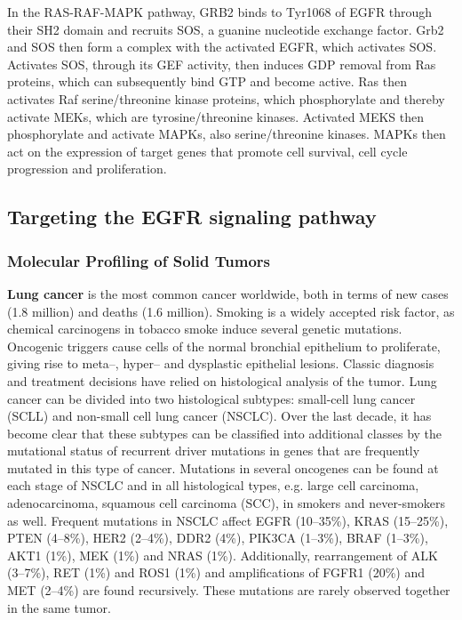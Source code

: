       In the RAS-RAF-MAPK pathway, GRB2 binds to Tyr1068 of EGFR through their
      SH2 domain and recruits SOS, a guanine nucleotide exchange factor. Grb2
      and SOS then form a complex with the activated EGFR, which activates SOS.
      Activates SOS, through its GEF activity, then induces GDP removal from Ras
      proteins, which can subsequently bind GTP and become active. Ras then
      activates Raf serine/threonine kinase proteins, which phosphorylate and
      thereby activate MEKs, which are tyrosine/threonine kinases. Activated
      MEKS then phosphorylate and activate MAPKs, also serine/threonine kinases.
      MAPKs then act on the expression of target genes that promote cell survival,
      cell cycle progression and proliferation.

  \subsection{Targeting the EGFR signaling pathway}

    \subsubsection{Molecular Profiling of Solid Tumors}

      \textbf{Lung cancer} is the most common cancer worldwide, both in terms of
      new cases (1.8 million) and deaths (1.6 million). Smoking is a widely
      accepted risk factor, as chemical carcinogens in tobacco smoke induce
      several genetic mutations. Oncogenic triggers cause cells of the normal
      bronchial epithelium to proliferate, giving rise to meta--, hyper-- and
      dysplastic epithelial lesions. Classic diagnosis and treatment decisions
      have relied on histological analysis of the tumor. Lung cancer can be
      divided into two histological subtypes: small-cell lung cancer (SCLL) and
      non-small cell lung cancer (NSCLC). Over the last decade, it has become
      clear that these subtypes can be classified into  additional classes by
      the mutational status of recurrent driver mutations in genes that are
      frequently mutated in this type of cancer. Mutations in several oncogenes
      can be found at each stage of NSCLC and in all histological types, e.g.
      large cell carcinoma, adenocarcinoma, squamous cell  carcinoma (SCC), in
      smokers and never-smokers as well. Frequent  mutations in NSCLC affect
      EGFR (10--35\%), KRAS (15--25\%), PTEN (4--8\%), HER2 (2--4\%), DDR2
      (4\%), PIK3CA (1--3\%), BRAF (1--3\%), AKT1 (1\%), MEK (1\%) and NRAS
      (1\%). Additionally, rearrangement of ALK (3--7\%), RET (1\%) and ROS1
      (1\%) and amplifications of FGFR1 (20\%) and MET (2--4\%) are found
      recursively. These mutations are rarely observed together in the same
      tumor.

